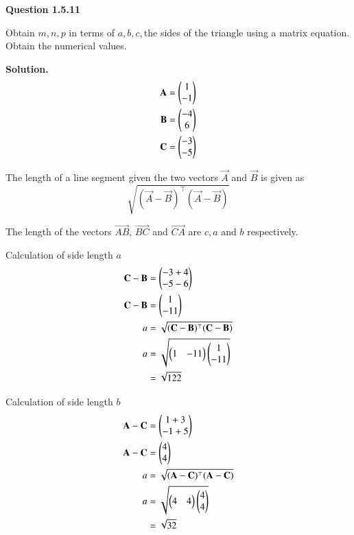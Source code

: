 \documentclass[journal,12pt,twocolumn]{IEEEtran}
\theoremstyle{remark}
\begin{document}



\maketitle
\textbf{Question 1.5.11}

\vspace{0.2cm}
Obtain $m,n,p$ in terms of $a,b,c$,\,the sides of the triangle using a matrix equation. Obtain the numerical values.

\vspace{0.3cm}
\textbf{Solution.}
\begin{align}
\mathbf{A} = \begin{pmatrix}1\\-1\end{pmatrix}\\
\mathbf{B} = \begin{pmatrix}-4\\6\end{pmatrix}\\
\mathbf{C} = \begin{pmatrix}-3\\-5\end{pmatrix}
\end{align}


\vspace{0.3cm}
The length of a line segment given the two vectors $\vec{A}$ and $\vec{B}$ is given as
$$\sqrt{(\vec{A}-\vec{B})^{\top}(\vec{A}-\vec{B})}$$

\vspace{0.3cm}
The length of the vectors $\vec{AB}$, $\vec{BC}$ and $\vec{CA}$ are $c,a$ and $b$ respectively.

\vspace{0.3cm}
Calculation of side length $a$
\begin{align}
\mathbf{C}-\mathbf{B} &= \begin{pmatrix}-3+4\\-5-6\end{pmatrix}\\
\mathbf{C}-\mathbf{B} &= \begin{pmatrix}1\\-11\end{pmatrix}\\
a &= \sqrt{(\mathbf{C}-\mathbf{B})^{\top}(\mathbf{C}-\mathbf{B})}\\
a &= \sqrt{\begin{pmatrix}1&-11\end{pmatrix}\begin{pmatrix}1\\-11\end{pmatrix}}\\
&= \sqrt{122}
\end{align}

\vspace{0.3cm}
Calculation of side length $b$
\begin{align}
\mathbf{A}-\mathbf{C} &= \begin{pmatrix}1+3\\-1+5\end{pmatrix}\\
\mathbf{A}-\mathbf{C} &= \begin{pmatrix}4\\4\end{pmatrix}\\
a &= \sqrt{(\mathbf{A}-\mathbf{C})^{\top}(\mathbf{A}-\mathbf{C})}\\
a &= \sqrt{\begin{pmatrix}4&4\end{pmatrix}\begin{pmatrix}4\\4\end{pmatrix}}\\
&= \sqrt{32}
\end{align}
\end{document}
